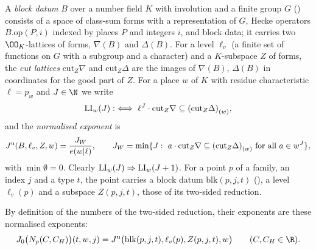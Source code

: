 \begin{definition}\label{pf:onto2:blocks}
A \emph{block datum} $B$ over a number field $K$ with involution and a finite group $G$ () consists
of a space of class-sum forms with a representation of $G$, Hecke operators $B.\mathrm{op}(P,i)$ indexed by places $P$ and integers
$i$, and block data; it carries two $\OO_K$-lattices of forms, $\nabla(B)$ and $\Delta(B)$. For a level $\ell_v$ (a finite set of
functions on $G$ with a subgroup and a character) and a $K$-subspace $Z$ of forms, the \emph{cut lattices} $\mathrm{cut}_Z\nabla$ and
$\mathrm{cut}_Z\Delta$ are the images of $\nabla(B)$, $\Delta(B)$ in coordinates for the good part of $Z$. For a place $w$ of $K$ with residue
characteristic $\ell=p_w$ and $J\in\N$ we write
\[
\ontoIILI_w(J):\iff \ell^J\cdot\mathrm{cut}_Z\nabla\subseteq\ontoIIloc{w}{(\mathrm{cut}_Z\Delta)},
\]
and the \emph{normalised exponent} is
\[
\ontoIIJu(B,\ell_v,Z,w)=\frac{J_W}{e(w|\ell)},\qquad J_W=\min\{J:\ a\cdot\mathrm{cut}_Z\nabla\subseteq\ontoIIloc
w{(\mathrm{cut}_Z\Delta)}\ \text{for all }a\in w^J\},
\]
with $\min\emptyset=0$. Clearly $\ontoIILI_w(J)\Rightarrow\ontoIILI_w(J+1)$. For a point $p$ of a family, an index $j$ and a type
$t$, the point carries a block datum $\mathrm{blk}(p,j,t)$ (), a level $\ell_v(p)$ and a subspace
$Z(p,j,t)$, those of its two-sided reduction.
\end{definition}

By definition of the numbers of the two-sided reduction, their exponents are these normalised exponents:
\begin{equation}\label{eq:pf:onto2:J0}
J_0\bigl(N_p(C,C_H)\bigr)(t,w,j)=\ontoIIJu\bigl(\mathrm{blk}(p,j,t),\ell_v(p),Z(p,j,t),w\bigr)\qquad(C,C_H\in\R).
\end{equation}

